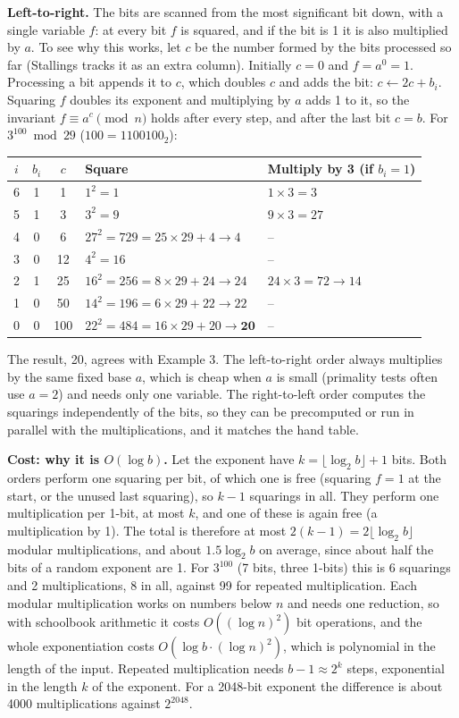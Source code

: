 \textbf{Left-to-right.} The bits are scanned from the most significant bit down, with a single variable $f$: at every bit $f$ is squared, and if the bit is 1 it is also multiplied by $a$. To see why this works, let $c$ be the number formed by the bits processed so far (Stallings tracks it as an extra column). Initially $c = 0$ and $f = a^0 = 1$. Processing a bit appends it to $c$, which doubles $c$ and adds the bit: $c \leftarrow 2c + b_i$. Squaring $f$ doubles its exponent and multiplying by $a$ adds 1 to it, so the invariant $f \equiv a^c \pmod n$ holds after every step, and after the last bit $c = b$. For $3^{100} \bmod 29$ ($100 = 1100100_2$):
\begin{center}\small
\begin{tabular}{@{}cccll@{}}
\toprule
$i$ & $b_i$ & $c$ & Square & Multiply by 3 (if $b_i = 1$)\\
\midrule
6 & 1 & 1 & $1^2 = 1$ & $1 \times 3 = 3$\\
5 & 1 & 3 & $3^2 = 9$ & $9 \times 3 = 27$\\
4 & 0 & 6 & $27^2 = 729 = 25 \times 29 + 4 \to 4$ & --\\
3 & 0 & 12 & $4^2 = 16$ & --\\
2 & 1 & 25 & $16^2 = 256 = 8 \times 29 + 24 \to 24$ & $24 \times 3 = 72 \to 14$\\
1 & 0 & 50 & $14^2 = 196 = 6 \times 29 + 22 \to 22$ & --\\
0 & 0 & 100 & $22^2 = 484 = 16 \times 29 + 20 \to \mathbf{20}$ & --\\
\bottomrule
\end{tabular}
\end{center}
The result, 20, agrees with Example 3. The left-to-right order always multiplies by the same fixed base $a$, which is cheap when $a$ is small (primality tests often use $a = 2$) and needs only one variable. The right-to-left order computes the squarings independently of the bits, so they can be precomputed or run in parallel with the multiplications, and it matches the hand table.

\textbf{Cost: why it is $O(\log b)$.} Let the exponent have $k = \lfloor \log_2 b \rfloor + 1$ bits. Both orders perform one squaring per bit, of which one is free (squaring $f = 1$ at the start, or the unused last squaring), so $k - 1$ squarings in all. They perform one multiplication per 1-bit, at most $k$, and one of these is again free (a multiplication by 1). The total is therefore at most $2(k - 1) = 2\lfloor \log_2 b \rfloor$ modular multiplications, and about $1.5 \log_2 b$ on average, since about half the bits of a random exponent are 1. For $3^{100}$ (7 bits, three 1-bits) this is 6 squarings and 2 multiplications, 8 in all, against 99 for repeated multiplication. Each modular multiplication works on numbers below $n$ and needs one reduction, so with schoolbook arithmetic it costs $O((\log n)^2)$ bit operations, and the whole exponentiation costs $O(\log b \cdot (\log n)^2)$, which is polynomial in the length of the input. Repeated multiplication needs $b - 1 \approx 2^k$ steps, exponential in the length $k$ of the exponent. For a 2048-bit exponent the difference is about 4000 multiplications against $2^{2048}$.

